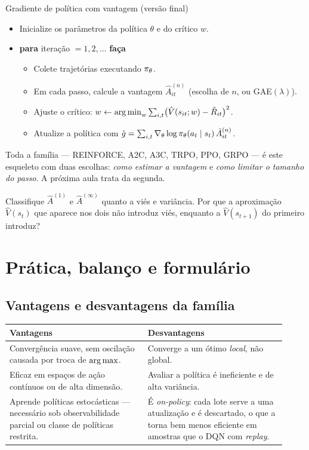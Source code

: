 \documentclass[11pt]{article}
\newcommand{\thv}{\theta}
\newcommand{\wv}{w}
\newcommand{\polth}{\pol_{\thv}}
\newcommand{\gth}{\nabla_{\thv}}
\newcommand{\Vhat}{\hat{V}}
\newcommand{\Ahat}{\hat{A}}
\begin{document}
\begin{algbox}{Gradiente de política com vantagem (versão final)}
\begin{itemize}[itemsep=0.1em]
  \item Inicialize os parâmetros da política $\thv$ e do crítico $\wv$.
  \item \textbf{para} iteração $=1,2,\dots$ \textbf{faça}
    \begin{itemize}[itemsep=0.05em]
      \item Colete trajetórias executando $\polth$.
      \item Em cada passo, calcule a vantagem $\Ahat^{(n)}_{it}$
        (escolha de $n$, ou GAE$(\lambda)$).
      \item Ajuste o crítico:
        $\wv \leftarrow \argmin_{\wv}\sum_{i,t}\bigl(\Vhat(s_{it};\wv)-\hat R_{it}\bigr)^2$.
      \item Atualize a política com
        $\hat g = \sum_{i,t}\gth\log\polth(a_t\mid s_t)\,\Ahat^{(n)}_{it}$.
    \end{itemize}
\end{itemize}
\end{algbox}

Toda a família --- REINFORCE, A2C, A3C, TRPO, PPO, GRPO --- é este esqueleto com
duas escolhas: \emph{como estimar a vantagem} e \emph{como limitar o tamanho do
passo}. A próxima aula trata da segunda.

\begin{discbox}
Classifique $\Ahat^{(1)}$ e $\Ahat^{(\infty)}$ quanto a viés e variância. Por que
a aproximação $\Vhat(s_t)$ que aparece nos dois não introduz viés, enquanto a
$\Vhat(s_{t+1})$ do primeiro introduz?
\end{discbox}

\section{Prática, balanço e formulário}

\subsection{Vantagens e desvantagens da família}

\begin{center}
\small
\begin{tabular}{@{}p{0.46\linewidth}p{0.46\linewidth}@{}}
\toprule
\textbf{Vantagens} & \textbf{Desvantagens}\\
\midrule
Convergência suave, sem oscilação causada por troca de $\operatorname*{arg\,max}$.
  & Converge a um ótimo \emph{local}, não global.\\
Eficaz em espaços de ação contínuos ou de alta dimensão.
  & Avaliar a política é ineficiente e de alta variância.\\
Aprende políticas estocásticas --- necessário sob observabilidade parcial
ou classe de políticas restrita.
  & É \emph{on-policy}: cada lote serve a uma atualização e é descartado,
    o que a torna bem menos eficiente em amostras que o DQN com \emph{replay}.\\
\bottomrule
\end{tabular}
\end{center}
\end{document}
